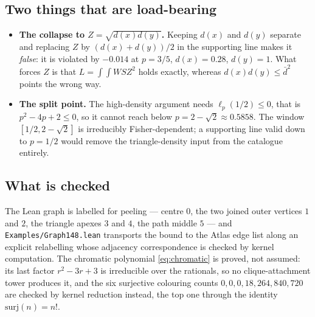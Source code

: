 \documentclass[11pt]{article}
\begin{document}
\subsection{Two things that are load-bearing}
\label{sec:app148-sharp}

\begin{itemize}
 \item \textbf{The collapse to $Z=\sqrt{d(x)d(y)}$.}  Keeping $d(x)$ and
 $d(y)$ separate and replacing $Z$ by $(d(x)+d(y))/2$ in the supporting line
 makes it \emph{false}: it is violated by $-0.014$ at $p=3/5$, $d(x)=0.28$,
 $d(y)=1$.  What forces $Z$ is that $L=\int\!\!\int W S Z^2$ holds exactly,
 whereas $d(x)d(y)\leq\bar d^2$ points the wrong way.
 \item \textbf{The split point.}  The high-density argument needs
 $\ell_p(1/2)\leq0$, that is $p^2-4p+2\leq0$, so it cannot reach below
 $p=2-\sqrt2\approx0.5858$.  The window $[1/2,2-\sqrt2]$ is irreducibly
 Fisher-dependent; a supporting line valid down to $p=1/2$ would remove the
 triangle-density input from the catalogue entirely.
\end{itemize}

\subsection{What is checked}
\label{sec:app148-scope}

The Lean graph is labelled for peeling — centre $0$, the two joined outer
vertices $1$ and $2$, the triangle apexes $3$ and $4$, the path middle $5$ —
and \texttt{Examples/Graph148.lean} transports the bound to the Atlas edge list
along an explicit relabelling whose adjacency correspondence is checked by
kernel computation.  The chromatic polynomial \eqref{eq:chromatic} is proved,
not assumed: its last factor $r^2-3r+3$ is irreducible over the rationals, so
no clique-attachment tower produces it, and the six surjective colouring counts
$0,0,0,18,264,840,720$ are checked by kernel reduction instead, the top one
through the identity $\mathrm{surj}(n)=n!$.
\end{document}
